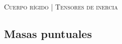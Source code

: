 \documentclass[11pt, spanish, a4paper, twoside]{article}
\begin{document}
\begin{center}
  \textsc{\large Cuerpo rígido | Tensores de inercia}
\end{center}


\begin{enumerate}

\section*{Masas puntuales}


\end{enumerate}
\end{document}

